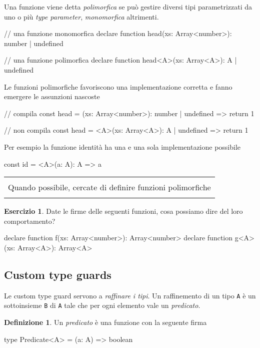 \documentclass[12pt]{article}
\theoremstyle{definition}
\newtheorem{definition}{Definizione}[section]
\newtheorem{exercise}{Esercizio}[subsection]
\newenvironment{boxed}
    {\begin{center}
    \begin{tabular}{|p{0.9\textwidth}|}
    \hline\\
    }
    {
    \\\\\hline
    \end{tabular}
    \end{center}
    }
\newenvironment{code}
  {\vspace{0.5cm} \VerbatimEnvironment\begin{typescriptcode}}
  {\end{typescriptcode} \vspace{0.2cm}}
\begin{document}
Una funzione viene detta \emph{polimorfica} se può gestire diversi tipi parametrizzati da uno o più \emph{type parameter},
\emph{monomorfica} altrimenti.

\begin{code}
// una funzione monomorfica
declare function head(xs: Array<number>): number | undefined

// una funzione polimorfica
declare function head<A>(xs: Array<A>): A | undefined
\end{code}

Le funzioni polimorfiche favoriscono una implementazione corretta e fanno emergere le assunzioni nascoste

\begin{code}
// compila
const head = (xs: Array<number>): number | undefined => {
  return 1
}

// non compila
const head = <A>(xs: Array<A>): A | undefined => {
  return 1
}
\end{code}

Per esempio la funzione identità ha una e una sola implementazione possibile

\begin{code}
const id = <A>(a: A): A => a
\end{code}

\begin{boxed}
Quando possibile, cercate di definire funzioni polimorfiche
\end{boxed}

\begin{exercise}
Date le firme delle seguenti funzioni, cosa possiamo dire del loro comportamento?

\begin{code}
declare function f(xs: Array<number>): Array<number>
declare function g<A>(xs: Array<A>): Array<A>
\end{code}
\end{exercise}

\subsection{Custom type guards}

Le custom type guard servono a \emph{raffinare i tipi}. Un raffinemento di un tipo \texttt{A} è un sottoinsieme \texttt{B} di \texttt{A}
tale che per ogni elemento vale un \emph{predicato}.

\begin{definition}
Un \emph{predicato} è una funzione con la seguente firma

\begin{code}
type Predicate<A> = (a: A) => boolean
\end{code}
\end{definition}
\end{document}

